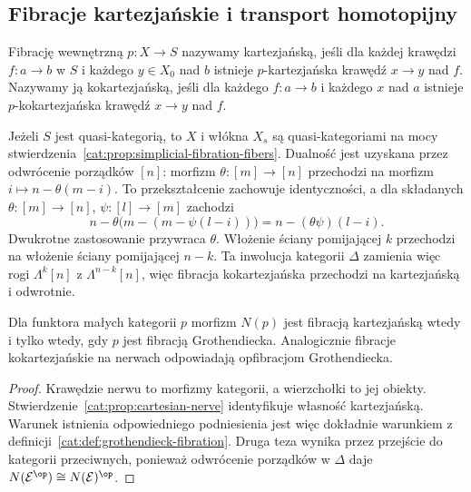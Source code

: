 \subsection{Fibracje kartezjańskie i transport homotopijny}

\begin{definicja}\label{cat:def:cartesian-quasicat-fibration}
Fibrację wewnętrzną $p:X\to S$ nazywamy kartezjańską, jeśli dla każdej krawędzi $f:a\to b$ w $S$ i każdego $y\in X_0$ nad $b$ istnieje $p$-kartezjańska krawędź $x\to y$ nad $f$. Nazywamy ją kokartezjańską, jeśli dla każdego $f:a\to b$ i każdego $x$ nad $a$ istnieje $p$-kokartezjańska krawędź $x\to y$ nad $f$.
\end{definicja}
Jeżeli $S$ jest quasi-kategorią, to $X$ i włókna $X_s$ są quasi-kategoriami na mocy stwierdzenia~\ref{cat:prop:simplicial-fibration-fibers}. Dualność jest uzyskana przez odwrócenie porządków $[n]$: morfizm $\theta:[m]\to[n]$ przechodzi na morfizm $i\mapsto n-\theta(m-i)$. To przekształcenie zachowuje identyczności, a dla składanych $\theta:[m]\to[n]$, $\psi:[l]\to[m]$ zachodzi
\[
 n-\theta\bigl(m-(m-\psi(l-i))\bigr)=n-(\theta\psi)(l-i).
\]
Dwukrotne zastosowanie przywraca $\theta$. Włożenie ściany pomijającej $k$ przechodzi na włożenie ściany pomijającej $n-k$. Ta inwolucja kategorii $\Delta$ zamienia więc rogi $\Lambda^k[n]$ z $\Lambda^{n-k}[n]$, więc fibracja kokartezjańska przechodzi na kartezjańską i odwrotnie.

\begin{wniosek}\label{cat:cor:grothendieck-nerve-fibration}
Dla funktora małych kategorii $p$ morfizm $N(p)$ jest fibracją kartezjańską wtedy i tylko wtedy, gdy $p$ jest fibracją Grothendiecka. Analogicznie fibracje kokartezjańskie na nerwach odpowiadają opfibracjom Grothendiecka.
\end{wniosek}
\begin{proof}
Krawędzie nerwu to morfizmy kategorii, a wierzchołki to jej obiekty. Stwierdzenie~\ref{cat:prop:cartesian-nerve} identyfikuje własność kartezjańską. Warunek istnienia odpowiedniego podniesienia jest więc dokładnie warunkiem z definicji~\ref{cat:def:grothendieck-fibration}. Druga teza wynika przez przejście do kategorii przeciwnych, ponieważ odwrócenie porządków w $\Delta$ daje $N(\mathcal E^{\op})\cong N(\mathcal E)^{\op}$.
\end{proof}


